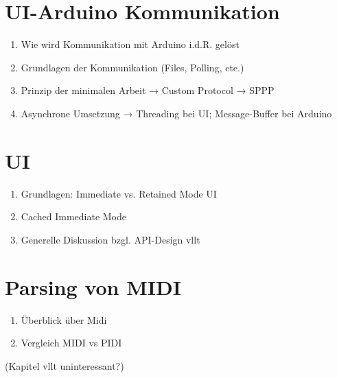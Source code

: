 \section{UI-Arduino Kommunikation} \label{vorgehenSW-SPPP}
\begin{enumerate}
    \item Wie wird Kommunikation mit Arduino i.d.R. gelöst
    \item Grundlagen der Kommunikation (Files, Polling, etc.)
    \item Prinzip der minimalen Arbeit → Custom Protocol → SPPP
    \item Asynchrone Umsetzung → Threading bei UI; Message-Buffer bei Arduino
\end{enumerate}

\section{UI} \label{vorgehenSW-UI}
\begin{enumerate}
    \item Grundlagen: Immediate vs. Retained Mode UI
    \item Cached Immediate Mode
    \item Generelle Diskussion bzgl. API-Design vllt
\end{enumerate}

\section{Parsing von MIDI} \label{vorgehenSW-MIDI}
\begin{enumerate}
    \item Überblick über Midi
    \item Vergleich MIDI vs PIDI
\end{enumerate}
(Kapitel vllt uninteressant?)